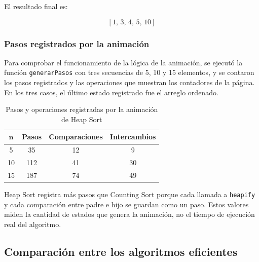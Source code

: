 \documentclass[11pt,letterpaper]{article}
\begin{document}
El resultado final es:

\[
\boxed{[1,\,3,\,4,\,5,\,10]}
\]

\subsubsection{Pasos registrados por la animación}

Para comprobar el funcionamiento de la lógica de la animación, se ejecutó la función \texttt{generar\-Pasos} con tres secuencias de 5, 10 y 15 elementos, y se contaron los pasos registrados y las operaciones que muestran los contadores de la página. En los tres casos, el último estado registrado fue el arreglo ordenado.

\begin{table}[H]
\centering
\caption{Pasos y operaciones registradas por la animación de Heap Sort}
\begin{tabular}{cccc}
\toprule
\(\boldsymbol{n}\) & \textbf{Pasos} & \textbf{Comparaciones} & \textbf{Intercambios} \\
\midrule
5 & 35 & 12 & 9 \\
10 & 112 & 41 & 30 \\
15 & 187 & 74 & 49 \\
\bottomrule
\end{tabular}
\end{table}

Heap Sort registra más pasos que Counting Sort porque cada llamada a \texttt{heapify} y cada comparación entre padre e hijo se guardan como un paso. Estos valores miden la cantidad de estados que genera la animación, no el tiempo de ejecución real del algoritmo.

\subsection{Comparación entre los algoritmos eficientes}
\end{document}
